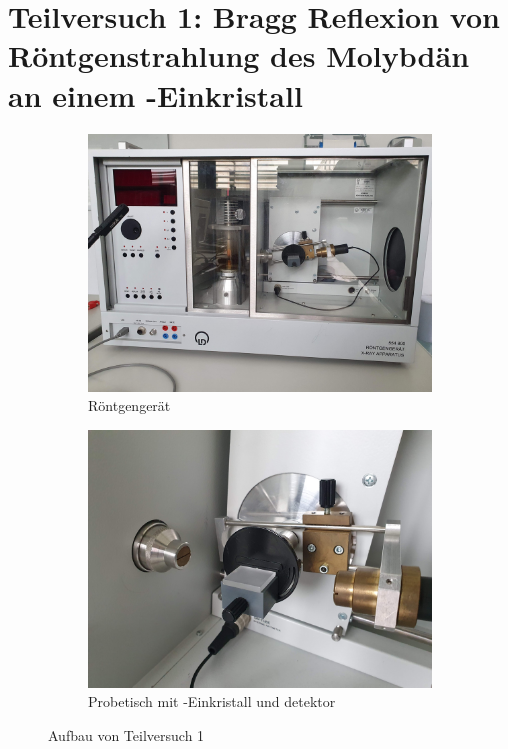 \section{Teilversuch 1: Bragg Reflexion von Röntgenstrahlung des Molybdän an einem -Einkristall}
	\begin{figure}[!ht]
		\centering
		\begin{subfigure}{0.48\textwidth}
			\centering
			\includegraphics[width=\textwidth]{images/tv1-aufbau.jpg}
			\caption{Röntgengerät}
			\label{fig:tv1-1}
		\end{subfigure}
		\begin{subfigure}{0.48\textwidth}
			\centering
			\includegraphics[width=\textwidth]{images/tv1-aufbau2.jpg}
			\caption{Probetisch mit -Einkristall und detektor}
			\label{fig:tv1-2}
		\end{subfigure}
	    \caption{Aufbau von Teilversuch 1}
	\end{figure}
